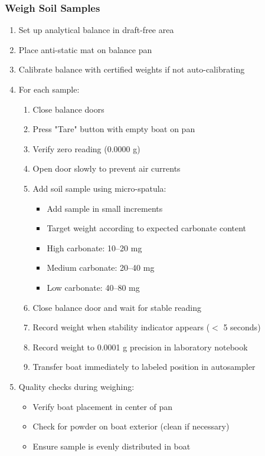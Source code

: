\documentclass[11pt,a4paper]{article}\usepackage[]{graphicx}\usepackage[]{xcolor}
\begin{document}
\subsubsection{Weigh Soil Samples}
\begin{enumerate}[noitemsep]
    \item Set up analytical balance in draft-free area
    \item Place anti-static mat on balance pan
    \item Calibrate balance with certified weights if not auto-calibrating
    \item For each sample:
    \begin{enumerate}
        \item Close balance doors
        \item Press "Tare" button with empty boat on pan
        \item Verify zero reading (0.0000 g)
        \item Open door slowly to prevent air currents
        \item Add soil sample using micro-spatula:
        \begin{itemize}
            \item Add sample in small increments
            \item Target weight according to expected carbonate content
            \item High carbonate: 10--20 mg
            \item Medium carbonate: 20--40 mg
            \item Low carbonate: 40--80 mg
        \end{itemize}
        \item Close balance door and wait for stable reading
        \item Record weight when stability indicator appears ($<$ 5 seconds)
        \item Record weight to 0.0001 g precision in laboratory notebook
        \item Transfer boat immediately to labeled position in autosampler
    \end{enumerate}
    \item Quality checks during weighing:
    \begin{itemize}
        \item Verify boat placement in center of pan
        \item Check for powder on boat exterior (clean if necessary)
        \item Ensure sample is evenly distributed in boat

\end{itemize}
\end{enumerate}
\end{document}
